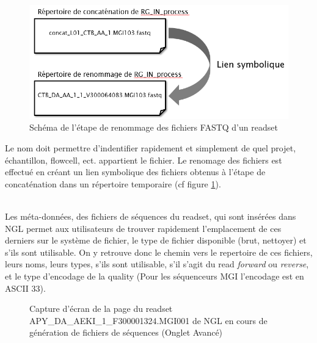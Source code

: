 \begin{minipage}{0.45\textwidth}
    \begin{figure}[H]
        \centering
        \includegraphics[width=1\textwidth]{img/Schema-renomage-fastq.png}
        \caption{\footnotesize{Schéma de l'étape de renommage des fichiers FASTQ d'un readset}}
        \label{schema-rename-fastq}
    \end{figure}
\end{minipage}
\hfill
\begin{minipage}{0.45\textwidth}
    Le nom doit permettre d'indentifier rapidement et simplement de quel projet, échantillon, flowcell, ect.
    appartient le fichier.
    Le renomage des fichiers est effectué en créant un lien symbolique des fichiers obtenus à l'étape de \og concaténation\fg{} dans un répertoire temporaire (cf figure \ref{schema-rename-fastq}).
\end{minipage}\\

Les méta-données, des fichiers de séquences du readset, qui sont insérées dans NGL permet aux utilisateurs de trouver rapidement l'emplacement de ces derniers sur le système de fichier, le type de fichier disponible (brut, nettoyer) et s'ils sont utilisable.
On y retrouve donc le chemin vers le repertoire de ces fichiers, leurs noms, leurs types, s'ils sont utilisable, s'il s'agit du read \emph{forward} ou \emph{reverse}, et le type d'encodage de la quality (Pour les séquenceurs MGI l'encodage est en ASCII 33).

\begin{figure}[H]
    \centering
    \caption{\footnotesize{Capture d'écran de la page du readset APY\_DA\_AEKI\_1\_F300001324.MGI001 de NGL en cours de génération de fichiers de séquences (Onglet \og Avancé\fg{})}}
    \label{meta-data-fastq}
\end{figure}

